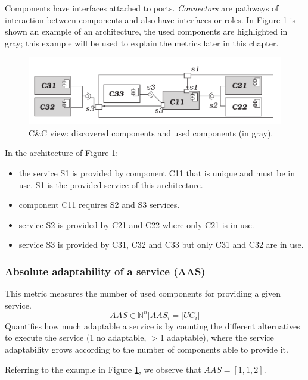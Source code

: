 Components have interfaces attached to ports. \emph{Connectors} are pathways of interaction between components and also have interfaces or roles. In Figure \ref{fig:solar-arch-example} is shown an example of an architecture, the used components are highlighted in gray; this example will be used to explain the metrics later in this chapter.

\begin{figure}[h]
	\centerline
	{\includegraphics[scale=0.55]{img/solar-arch-example.png}}
	\caption[SOLAR example architecure]{C\&C view: discovered components and used components (in gray).\cite{solar}}
	\label{fig:solar-arch-example}
\end{figure}

In the architecture of Figure \ref{fig:solar-arch-example}:
\begin{itemize}
	\item the service S1 is provided by component C11 that is unique and must be in use. S1 is the provided service of this architecture.
	\item component C11 requires S2 and S3 services.
	\item service S2 is provided by C21 and C22 where only C21 is in use.
	\item service S3 is provided by C31, C32 and C33 but only C31 and C32 are in use.
\end{itemize}

\subsubsection{Absolute adaptability of a service (AAS)}
This metric measures the number of used components for providing a given service.
\[ AAS \in \mathbb{N}^n |AAS_i = |UC_i|\]
Quantifies how much adaptable a service is by counting the different alternatives to execute the service (1 no adaptable, $>$1 adaptable), where the service adaptability grows according to the number of components able to provide it. 

Referring to the example in Figure \ref{fig:solar-arch-example}, we observe that $AAS = [1, 1, 2]$.

